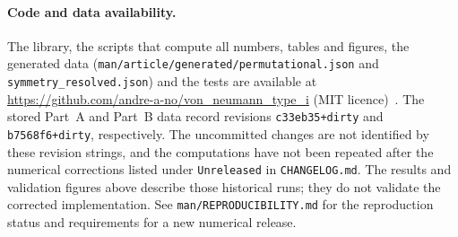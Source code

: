 \documentclass[11pt]{article}
\newcommand{\code}[1]{\nolinkurl{#1}}
\begin{document}
\paragraph{Code and data availability.} The library, the scripts that compute all numbers, tables and figures, the
generated data (\code{man/article/generated/permutational.json} and \code{symmetry_resolved.json}) and the tests
are available at \url{https://github.com/andre-a-no/von_neumann_type_i} (MIT licence)~\cite{lib}.
The stored Part~A and Part~B data record revisions \texttt{c33eb35+dirty} and \texttt{b7568f6+dirty}, respectively.
The uncommitted changes are not identified by these revision strings, and the computations have not been repeated
after the numerical corrections listed under \texttt{Unreleased} in \texttt{CHANGELOG.md}. The results and validation
figures above describe those historical runs; they do not validate the corrected implementation. See
\texttt{man/REPRODUCIBILITY.md} for the reproduction status and requirements for a new numerical release.
\end{document}
